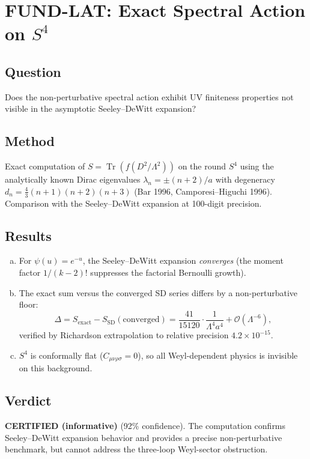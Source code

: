 \documentclass[12pt,a4paper]{article}
\newcommand{\Tr}{\operatorname{Tr}}
\newcommand{\Lam}{\Lambda}
\begin{document}
\section{FUND-LAT: Exact Spectral Action on $S^4$}
\label{sec:lat}

\subsection{Question}
Does the non-perturbative spectral action exhibit UV finiteness properties not
visible in the asymptotic Seeley--DeWitt expansion?

\subsection{Method}
Exact computation of $S = \Tr(f(D^2/\Lam^2))$ on the round $S^4$ using the
analytically known Dirac eigenvalues $\lambda_n = \pm(n+2)/a$ with degeneracy
$d_n = \frac{4}{3}(n+1)(n+2)(n+3)$ (Bar 1996, Camporesi--Higuchi 1996).
Comparison with the Seeley--DeWitt expansion at 100-digit precision.

\subsection{Results}
\begin{enumerate}[(a)]
  \item For $\psi(u) = e^{-u}$, the Seeley--DeWitt expansion \emph{converges}
    (the moment factor $1/(k-2)!$ suppresses the factorial Bernoulli growth).
  \item The exact sum versus the converged SD series differs by a
    non-perturbative floor:
    \begin{equation}
      \Delta = S_{\mathrm{exact}} - S_{\mathrm{SD}}(\text{converged})
      = \frac{41}{15120} \cdot \frac{1}{\Lam^4 a^4}
      + \mathcal{O}(\Lam^{-6}),
    \end{equation}
    verified by Richardson extrapolation to relative precision $4.2 \times 10^{-15}$.
  \item $S^4$ is conformally flat ($C_{\mu\nu\rho\sigma} = 0$), so all
    Weyl-dependent physics is invisible on this background.
\end{enumerate}

\subsection{Verdict}
\textcolor{near}{\textbf{CERTIFIED (informative)}} (92\% confidence).  The
computation confirms Seeley--DeWitt expansion behavior and provides a precise
non-perturbative benchmark, but cannot address the three-loop Weyl-sector
obstruction.
\end{document}
